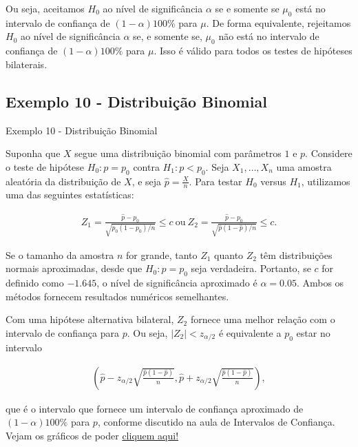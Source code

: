 \documentclass[12pt]{beamer}
\begin{document}
\begin{frame}{}
\begin{block}{}
\justifying
Ou seja, aceitamos $H_0$ ao nível de significância $\alpha$ se e somente se $\mu_0$ está no intervalo de confiança de $(1 - \alpha)100\%$ para $\mu$. De forma equivalente, rejeitamos $H_0$ ao nível de significância $\alpha$ se, e somente se, $\mu_0$ não está no intervalo de confiança de $(1 - \alpha)100\%$ para $\mu$. Isso é válido para todos os testes de hipóteses bilaterais.
\end{block}
\end{frame}

\subsection{Exemplo 10 - Distribuição Binomial}
\begin{frame}{Exemplo 10 - Distribuição Binomial}
\begin{block}{}
\justifying
Suponha que $X$ segue uma distribuição binomial com parâmetros $1$ e $p$. Considere o teste de hipótese $H_0 : p = p_0$ contra $H_1 : p < p_0$. Seja $X_1, \ldots, X_n$ uma amostra aleatória da distribuição de $X$, e seja $\hat{p} = \frac{X}{n}$. Para testar $H_0$ versus $H_1$, utilizamos uma das seguintes estatísticas:

\begin{align*}
Z_1 = \frac{\hat{p} - p_0}{\sqrt{p_0(1 - p_0)/n}} \leq c~\text{ou}~Z_2 = \frac{\hat{p}-p_0}{\sqrt{\hat{p}(1 - \hat{p})/n}} \leq c.
\end{align*}

Se o tamanho da amostra $n$ for grande, tanto $Z_1$ quanto $Z_2$ têm distribuições normais aproximadas, desde que $H_0 : p = p_0$ seja verdadeira. Portanto, se $c$ for definido como $-1.645$, o nível de significância aproximado é $\alpha = 0.05$. Ambos os métodos fornecem resultados numéricos semelhantes.
\end{block}
\end{frame}


\begin{frame}{}
\begin{block}{}
\justifying
Com uma hipótese alternativa bilateral, $Z_2$ fornece uma melhor relação com o intervalo de confiança para $p$. Ou seja, $|Z_2| < z_{\alpha/2}$ é equivalente a $p_0$ estar no intervalo

\begin{align*}
\left(\hat{p} - z_{\alpha/2}\sqrt{\frac{\hat{p}(1 - \hat{p})}{n}}, \hat{p} + z_{\alpha/2}\sqrt{\frac{\hat{p}(1 - \hat{p})}{n}}\right),
\end{align*}

que é o intervalo que fornece um intervalo de confiança aproximado de $(1 - \alpha)100\%$ para $p$, conforme discutido na aula de Intervalos de Confiança. Vejam os gráficos de poder \href{https://est711.shinyapps.io/FuncaoPoder/}{cliquem aqui!}
\end{block}
\end{frame}
\end{document}

